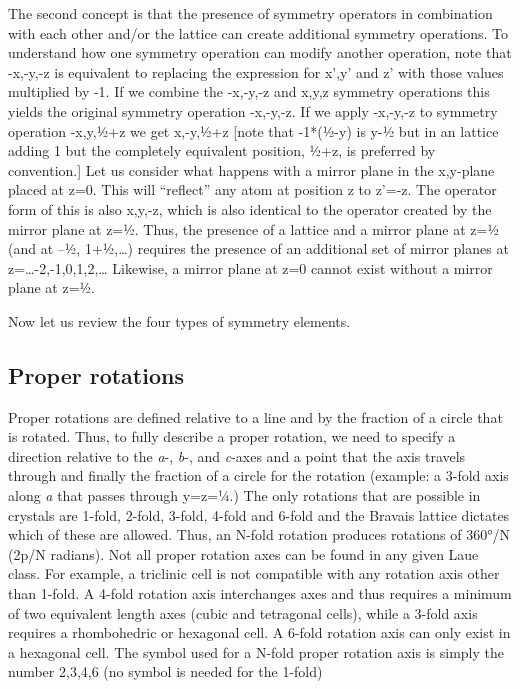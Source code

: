 The second concept is that the presence of symmetry operators in combination with each other and/or the lattice can create additional symmetry operations. To understand how one symmetry operation can modify another operation, note that -x,-y,-z is equivalent to replacing the expression for x’,y’ and z’ with those values multiplied by -1. If we combine the -x,-y,-z and x,y,z symmetry operations this yields the original symmetry operation -x,-y,-z. If we apply -x,-y,-z to symmetry operation -x,y,½+z we get x,-y,½+z [note that -1*(½-y) is y-½ but in an lattice adding 1 but the completely equivalent position, ½+z, is preferred by convention.] Let us consider what happens with a mirror plane in the x,y-plane placed at z=0. This will ``reflect'' any atom at position z to z’=-z. The operator form of this is also x,y,-z, which is also identical to the operator created by the mirror plane at z=½. Thus, the presence of a lattice and a mirror plane at z=½ (and at –½, 1+½,…) requires the presence of an additional set of mirror planes at z=…-2,-1,0,1,2,… Likewise, a mirror plane at z=0 cannot exist without a mirror plane at z=½.

Now let us review the four types of symmetry elements.

\subsection{Proper rotations} Proper rotations are defined relative to a line and by the fraction of a circle that is rotated. Thus, to fully describe a proper rotation, we need to specify a direction relative to the \textit{a}-, \textit{b}-, and \textit{c}-axes and a point that the axis travels through and finally the fraction of a circle for the rotation (example: a 3-fold axis along \textit{a} that passes through y=z=¼.) The only rotations that are possible in crystals are 1-fold, 2-fold, 3-fold, 4-fold and 6-fold and the Bravais lattice dictates which of these are allowed. Thus, an N-fold rotation produces rotations of 360°/N (2p/N radians). Not all proper rotation axes can be found in any given Laue class. For example, a triclinic cell is not compatible with any rotation axis other than 1-fold. A 4-fold rotation axis interchanges axes and thus requires a minimum of two equivalent length axes (cubic and tetragonal cells), while a 3-fold axis requires a rhombohedric or hexagonal cell. A 6-fold rotation axis can only exist in a hexagonal cell. The symbol used for a N-fold proper rotation axis is simply the number 2,3,4,6 (no symbol is needed for the 1-fold)

